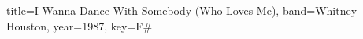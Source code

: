 \documentclass{../../tex/bekki-leadsheet}
\begin{document}
\begin{song}{title={I Wanna Dance With Somebody (Who Loves Me)}, band={Whitney Houston}, year={1987}, key={F#}}

  

\end{song}
\end{document}
